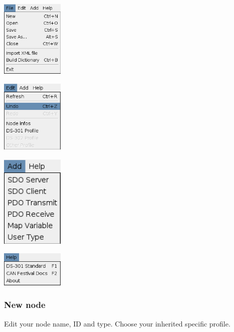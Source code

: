 \documentclass[a4paper,12pt]{book}
\begin{document}
 \begin{center}
   \includegraphics[width=3cm]{Pictures/10000000000000B6000000DF1EDD1E73.png}
\end{center}
  \begin{center}
   \includegraphics[width=3cm]{Pictures/10000000000000AC000000C9C3F53FA6.png}
\end{center}
 \begin{center}
   \includegraphics[width=3cm]{Pictures/100000000000006D000000A31EC8CB54.png}
\end{center}
  \begin{center}
   \includegraphics[width=3cm]{Pictures/10000000000000AA0000006014F74635.png}
\end{center}

\subsubsection{New node}
Edit your node name, ID and type. Choose your inherited specific
profile.
\end{document}
